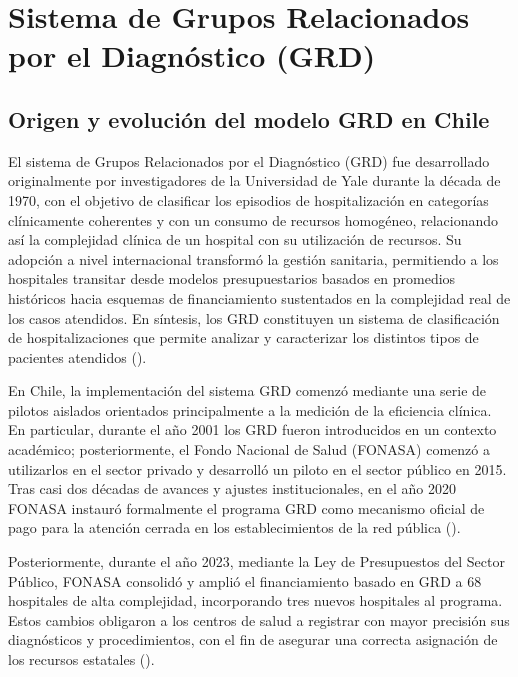 \section{Sistema de Grupos Relacionados por el Diagnóstico (GRD)}

\subsection{Origen y evolución del modelo GRD en Chile}

El sistema de Grupos Relacionados por el Diagnóstico (GRD) fue desarrollado originalmente por investigadores de la Universidad de Yale durante la década de 1970, con el objetivo de clasificar los episodios de hospitalización en categorías clínicamente coherentes y con un consumo de recursos homogéneo, relacionando así la complejidad clínica de un hospital con su utilización de recursos. Su adopción a nivel internacional transformó la gestión sanitaria, permitiendo a los hospitales transitar desde modelos presupuestarios basados en promedios históricos hacia esquemas de financiamiento sustentados en la complejidad real de los casos atendidos. En síntesis, los GRD constituyen un sistema de clasificación de hospitalizaciones que permite analizar y caracterizar los distintos tipos de pacientes atendidos (\cite{Cid2024}).


En Chile, la implementación del sistema GRD comenzó mediante una serie de pilotos aislados orientados principalmente a la medición de la eficiencia clínica. En particular, durante el año 2001 los GRD fueron introducidos en un contexto académico; posteriormente, el Fondo Nacional de Salud (FONASA) comenzó a utilizarlos en el sector privado y desarrolló un piloto en el sector público en 2015. Tras casi dos décadas de avances y ajustes institucionales, en el año 2020 FONASA instauró formalmente el programa GRD como mecanismo oficial de pago para la atención cerrada en los establecimientos de la red pública (\cite{Cid2024}).

Posteriormente, durante el año 2023, mediante la Ley de Presupuestos del Sector Público, FONASA consolidó y amplió el financiamiento basado en GRD a 68 hospitales de alta complejidad, incorporando tres nuevos hospitales al programa. Estos cambios obligaron a los centros de salud a registrar con mayor precisión sus diagnósticos y procedimientos, con el fin de asegurar una correcta asignación de los recursos estatales (\cite{fonasa2023_presupuesto, metamodelo2024_analisis}).


